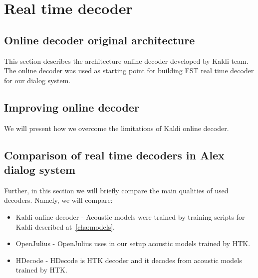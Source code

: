 \chapter{Real time decoder}
\label{cha:decoder}



\section{Online decoder original architecture} 
\label{sec:kaldi_decoder_architecture}
This section describes the architecture online decoder developed by Kaldi team.
The online decoder was used as starting point for building FST real time decoder for our dialog system.


\section{Improving online decoder} 
\label{sec:improve}
We will present how we overcome the limitations of Kaldi online decoder.



\section[Comparison of real time decoders]{Comparison of real time decoders in Alex dialog system} 
\label{sec:comparison_of_real_time_decoders_in_alex_dialog_system}
Further, in this section we will briefly compare the main qualities of used decoders.
Namely, we will compare: 
\begin{itemize}
    \item Kaldi online decoder - Acoustic models were trained by training scripts for Kaldi described at~\ref{cha:models}.
    \item OpenJulius - OpenJulius uses in our setup acoustic models trained by HTK. 
    \item HDecode - HDecode is HTK decoder and it decodes from acoustic models trained by HTK.
\end{itemize}


